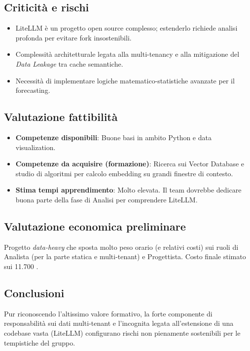 \documentclass[a4paper, 11pt]{article}
\begin{document}
\subsection{Criticità e rischi}
\begin{itemize}[label=-]
    \item LiteLLM è un progetto open source complesso; estenderlo richiede analisi profonda per evitare fork insostenibili.
    \item Complessità architetturale legata alla multi-tenancy e alla mitigazione del \textit{Data Leakage} tra cache semantiche.
    \item Necessità di implementare logiche matematico-statistiche avanzate per il forecasting.
\end{itemize}

\subsection{Valutazione fattibilità}
\begin{itemize}[label=-]
    \item \textbf{Competenze disponibili}: Buone basi in ambito Python e data visualization.
    \item \textbf{Competenze da acquisire (formazione)}: Ricerca sui Vector Database e studio di algoritmi per calcolo embedding su grandi finestre di contesto.
    \item \textbf{Stima tempi apprendimento}: Molto elevata. Il team dovrebbe dedicare buona parte della fase di Analisi per comprendere LiteLLM.
\end{itemize}

\subsection{Valutazione economica preliminare}
Progetto \textit{data-heavy} che sposta molto peso orario (e relativi costi) sui ruoli di Analista (per la parte statica e multi-tenant) e Progettista. Costo finale stimato sui 11.700 \texteuro.

\subsection{Conclusioni}
Pur riconoscendo l'altissimo valore formativo, la forte componente di responsabilità sui dati multi-tenant e l'incognita legata all'estensione di una codebase vasta (LiteLLM) configurano rischi non pienamente sostenibili per le tempistiche del gruppo.
\end{document}
